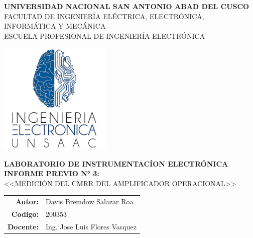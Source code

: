 \begin{titlepage}

  \begin{center}
    \Large{\textbf{UNIVERSIDAD NACIONAL SAN ANTONIO ABAD DEL CUSCO}} \\ 
    \vspace{0.4cm}
    \large{FACULTAD DE INGENIER\'IA EL\'ECTRICA, ELECTR\'ONICA, INFORM\'ATICA Y MEC\'ANICA}\ \\ 
    \vspace{0.1cm} 
    \large{ESCUELA PROFESIONAL DE INGENIER\'IA ELECTR\'ONICA}\ \\ 
	
    \vspace{1.0cm}    
    
    \includegraphics[width=0.4\textwidth]{images/LI-UNSAAC.png} \\


    \vspace{0.8cm}

    \large{\textbf{\textsc{LABORATORIO DE INSTRUMENTAC\'ION ELECTR\'ONICA}}} \\
    \vspace{0.2cm}
    \large{\textbf{\textsc{INFORME PREVIO N° 3:}}} \\ 
    
    
    \vspace{0.5cm}
    \large{ \textsc{<<MEDICIÓN DEL CMRR DEL AMPLIFICADOR OPERACIONAL>>}} \\
    \vspace{1.0cm}
    
    \begin{table}[H]
    	\centering
    	\begin{tabular}{rl}
    		\large{\textbf{Autor:}}   & \large{Davis Bremdow Salazar Roa}  \\
    		\large{\textbf{Codigo:}}   & \large{200353}  \\
    		\large{\textbf{Docente:}} & \large{Ing. Jose Luis Flores Vasquez}
    	\end{tabular}
    \end{table}


\end{center}
\end{titlepage}
